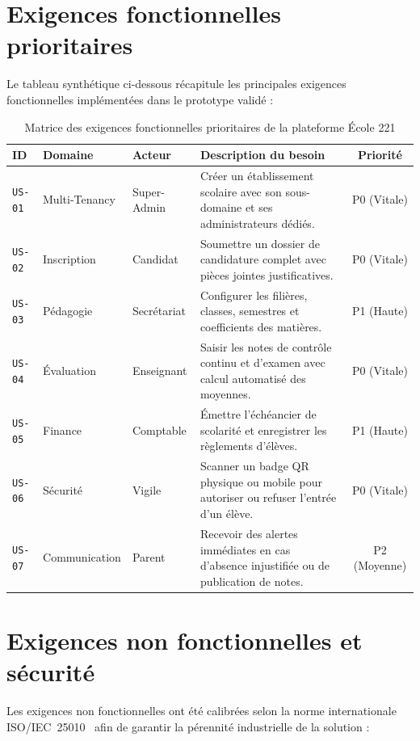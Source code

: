\section{Exigences fonctionnelles prioritaires}

Le tableau synthétique ci-dessous récapitule les principales exigences fonctionnelles implémentées dans le prototype validé :

\begin{table}[htbp]
  \centering
  \small
  \begin{tabular}{lllp{6.5cm}c}
    \toprule
    \textbf{ID} & \textbf{Domaine} & \textbf{Acteur} & \textbf{Description du besoin} & \textbf{Priorité} \\
    \midrule
    \texttt{US-01} & Multi-Tenancy & Super-Admin & Créer un établissement scolaire avec son sous-domaine et ses administrateurs dédiés. & P0 (Vitale) \\
    \texttt{US-02} & Inscription & Candidat & Soumettre un dossier de candidature complet avec pièces jointes justificatives. & P0 (Vitale) \\
    \texttt{US-03} & Pédagogie & Secrétariat & Configurer les filières, classes, semestres et coefficients des matières. & P1 (Haute) \\
    \texttt{US-04} & Évaluation & Enseignant & Saisir les notes de contrôle continu et d'examen avec calcul automatisé des moyennes. & P0 (Vitale) \\
    \texttt{US-05} & Finance & Comptable & Émettre l'échéancier de scolarité et enregistrer les règlements d'élèves. & P1 (Haute) \\
    \texttt{US-06} & Sécurité & Vigile & Scanner un badge QR physique ou mobile pour autoriser ou refuser l'entrée d'un élève. & P0 (Vitale) \\
    \texttt{US-07} & Communication & Parent & Recevoir des alertes immédiates en cas d'absence injustifiée ou de publication de notes. & P2 (Moyenne) \\
    \bottomrule
  \end{tabular}
  \caption{Matrice des exigences fonctionnelles prioritaires de la plateforme École 221}
  \label{tab:exigences-fonctionnelles}
\end{table}

\section{Exigences non fonctionnelles et sécurité}

Les exigences non fonctionnelles ont été calibrées selon la norme internationale ISO/IEC~25010~\cite{iso25010} afin de garantir la pérennité industrielle de la solution :

